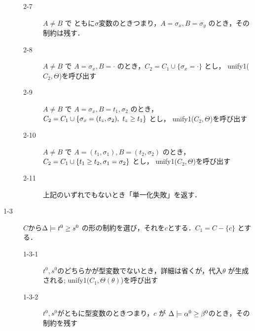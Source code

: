 \begin{oframed}
\begin{description}
\begin{description}
    \item[2-7] $A \neq B$ で ともに$\sigma$変数のときつまり，$A = \sigma_x , B = \sigma_y$ のとき，その制約は残す．
    \item[2-8] $A \neq B$ で $A = \sigma_x , B = \cdot$ のとき，$C_2 = C_1 \cup \{\sigma_x = \cdot\}$ とし， unify1($C_2, \Theta$)を呼び出す
    \item[2-9] $A \neq B$ で $A = \sigma_x , B = t_1, \sigma_2$ のとき，$C_2 = C_1 \cup \{\sigma_x = (t_z,\sigma_2),~ {t_z} \ge {t_1} \}$ とし， unify1($C_2, \Theta$)を呼び出す
    \item[2-10] $A \neq B$ で $A = (t_1, \sigma_1) , B = (t_2, \sigma_2)$ のとき，$C_2 = C_1 \cup \{{t_1} \ge {t_2}, \sigma_1 = \sigma_2 \}$ とし， unify1($C_2, \Theta$)を呼び出す
    \item[2-11] 上記のいずれでもないとき「単一化失敗」を返す．
    \end{description}
  \item[1-3] $C$から$\Delta \models {t^0} \ge {s^0}$ の形の制約を選び，それを$c$とする．$C_1 = C - \{c\}$ とする．
    \begin{description}
    \item[1-3-1] $t^0,s^0$のどちらかが型変数でないとき，詳細は省くが，代入$\theta$ が生成される;
      unify1($C_1, \Theta(\theta)$)を呼び出す
    \item[1-3-2] $t^0,s^0$がともに型変数のときつまり，$c$ が $\Delta \models {\alpha^0} \ge {\beta^0}$のとき，その制約を残す
    \end{description}
  \end{description}
\end{oframed}




